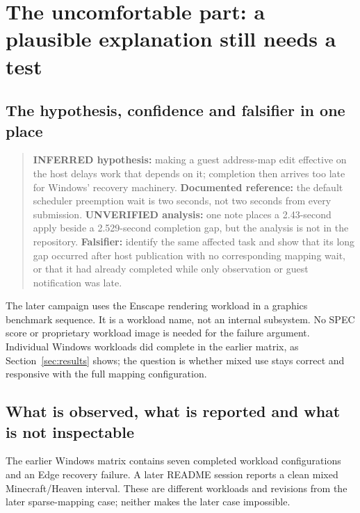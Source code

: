 \clearpage
\section{The uncomfortable part: a plausible explanation still needs a test}
\label{sec:uncomfortable}

\subsection{The hypothesis, confidence and falsifier in one place}

\begin{quote}
\textbf{INFERRED hypothesis:} making a guest address-map edit effective on the host delays
work that depends on it; completion then arrives too late for Windows' recovery machinery.
\textbf{Documented reference:} the default scheduler preemption wait is two seconds, not two
seconds from every submission. \textbf{UNVERIFIED analysis:} one note places a 2.43-second apply
beside a 2.529-second completion gap, but the analysis is not in the repository.
\textbf{Falsifier:} identify the same affected task and show that its long gap occurred after
host publication with no corresponding mapping wait, or that it had already completed while
only observation or guest notification was late.
\end{quote}

The later campaign uses the Enscape rendering workload in a graphics benchmark sequence.
It is a workload name, not an internal subsystem. No SPEC score or proprietary workload image
is needed for the failure argument. Individual Windows workloads did complete in the earlier
matrix, as Section~\ref{sec:results} shows; the question is whether mixed use stays correct and
responsive with the full mapping configuration.



\subsection{What is observed, what is reported and what is not inspectable}

\reported The earlier Windows matrix contains seven completed workload configurations and
an Edge recovery failure. A later README session reports a clean mixed Minecraft/Heaven
interval. These are different workloads and revisions from the later sparse-mapping case;
neither makes the later case impossible.

